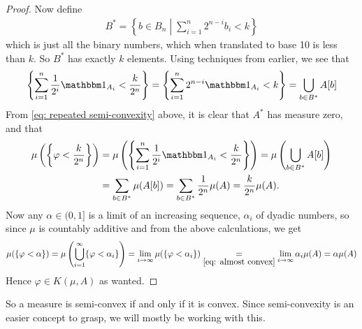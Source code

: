 \begin{proof}
Now define
\begin{align*}
	B^{*}=\left\{b\in B_{n} \middle| \sum_{i=1}^{n} 2^{n-i}b_{i} < k \right\}
\end{align*}
which is just all the binary numbers, which when translated to base 10 is less than $k$. So $B^{*}$ has exactly $k$ elements. Using techniques from earlier, we see that
\begin{align*}
	\left\{ \sum_{i=1}^{n} \frac{1}{2^{i}} \ind{A_{i}} < \frac{k}{2^{n}} \right\} = \left\{ \sum_{i=1}^{n} 2^{n-i} \ind{A_{i}} < k \right\} = \bigcup_{b\in B^{*}} A[b]
\end{align*}
From \eqref{eq: repeated semi-convexity} above, it is clear that $A^{*}$ has measure zero, and that
\begin{align}
	\mu\left( \left\{ \varphi < \frac{k}{2^{n}} \right\} \right) &= \mu\left( \left\{ \sum_{i=1}^{n} \frac{1}{2^{i}}\ind{A_{i}} < \frac{k}{2^{n}} \right\} \right) = \mu\left( \bigcup_{b\in B^{*}} A[b] \right) \nonumber \\
	&= \sum_{b\in B^{*}} \mu(A[b]) = \sum_{b\in B^{*}} \frac{1}{2^{n}} \mu(A) = \frac{k}{2^{n}}\mu(A). \label{eq: almost convex}
\end{align}
Now any $\alpha\in (0,1]$ is a limit of an increasing sequence, $\alpha_{i}$ of dyadic numbers, so since $\mu$ is countably additive and from the above calculations, we get
\begin{align*}
	\mu( \{ \varphi < \alpha \} ) = \mu\left( \bigcup_{i=1}^{\infty} \{ \varphi < \alpha_{i} \} \right) = \lim_{i\to \infty} \mu( \{ \varphi < \alpha_{i} \} ) \underset{\eqref{eq: almost convex}}{=} \lim_{i\to \infty} \alpha_{i}\mu(A) = \alpha \mu(A)
\end{align*}
Hence $\varphi\in K(\mu, A)$ as wanted.
\end{proof}

So a measure is semi-convex if and only if it is convex. Since semi-convexity is an easier concept to grasp, we will mostly be working with this.


